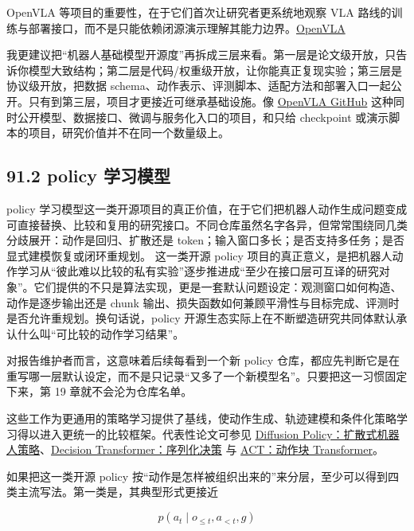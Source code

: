 OpenVLA 等项目的重要性，在于它们首次让研究者更系统地观察 VLA 路线的训练与部署接口，而不是只能依赖闭源演示理解其能力边界。\href{https://arxiv.org/abs/2406.09246}{OpenVLA}

我更建议把“机器人基础模型开源度”再拆成三层来看。第一层是论文级开放，只告诉你模型大致结构；第二层是代码/权重级开放，让你能真正复现实验；第三层是协议级开放，把数据 schema、动作表示、评测脚本、适配方法和部署入口一起公开。只有到第三层，项目才更接近可继承基础设施。像 \href{https://github.com/openvla/openvla}{OpenVLA GitHub} 这种同时公开模型、数据接口、微调与服务化入口的项目，和只给 checkpoint 或演示脚本的项目，研究价值并不在同一个数量级上。

\subsection*{91.2 policy 学习模型}


policy 学习模型这一类开源项目的真正价值，在于它们把机器人动作生成问题变成可直接替换、比较和复用的研究接口。不同仓库虽然名字各异，但常常围绕同几类分歧展开：动作是回归、扩散还是 token；输入窗口多长；是否支持多任务；是否显式建模恢复或闭环重规划。 这一类开源 policy 项目的真正意义，是把机器人动作学习从“彼此难以比较的私有实验”逐步推进成“至少在接口层可互译的研究对象”。它们提供的不只是算法实现，更是一套默认问题设定：观测窗口如何构造、动作是逐步输出还是 chunk 输出、损失函数如何兼顾平滑性与目标完成、评测时是否允许重规划。换句话说，policy 开源生态实际上在不断塑造研究共同体默认承认什么叫“可比较的动作学习结果”。

对报告维护者而言，这意味着后续每看到一个新 policy 仓库，都应先判断它是在重写哪一层默认设定，而不是只记录“又多了一个新模型名”。只要把这一习惯固定下来，第 19 章就不会沦为仓库名单。

这些工作为更通用的策略学习提供了基线，使动作生成、轨迹建模和条件化策略学习得以进入更统一的比较框架。代表性论文可参见 \href{https://arxiv.org/abs/2303.04137}{Diffusion Policy：扩散式机器人策略}、\href{https://arxiv.org/abs/2106.01345}{Decision Transformer：序列化决策} 与 \href{https://arxiv.org/abs/2304.13705}{ACT：动作块 Transformer}。

如果把这一类开源 policy 按“动作是怎样被组织出来的”来分层，至少可以得到四类主流写法。第一类是\texttt{}，其典型形式更接近

\begin{equation*}
p(a_t \mid o_{\le t}, a_{<t}, g)
\end{equation*}

